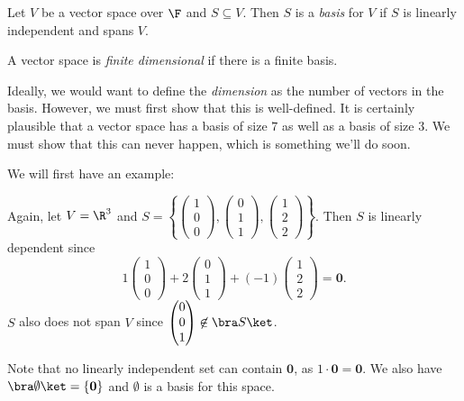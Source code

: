 \documentclass[a4paper]{article}
\begin{document}
\begin{defi}[Basis]
  Let $V$ be a vector space over $\F$ and $S\subseteq V$. Then $S$ is a \emph{basis} for $V$ if $S$ is linearly independent and spans $V$.
\end{defi}

\begin{defi}
  A vector space is \emph{finite dimensional} if there is a finite basis.
\end{defi}
Ideally, we would want to define the \emph{dimension} as the number of vectors in the basis. However, we must first show that this is well-defined. It is certainly plausible that a vector space has a basis of size $7$ as well as a basis of size $3$. We must show that this can never happen, which is something we'll do soon.

We will first have an example:
\begin{eg}
  Again, let $V = \R^3$ and $S = \left\{\begin{pmatrix}1\\0\\0\end{pmatrix}, \begin{pmatrix}0\\1\\1\end{pmatrix}, \begin{pmatrix}1\\2\\2\end{pmatrix}\right\}$. Then $S$ is linearly dependent since
  \[
    1\begin{pmatrix}1\\0\\0\end{pmatrix} + 2\begin{pmatrix}0\\1\\1\end{pmatrix} + (-1) \begin{pmatrix}1\\2\\2\end{pmatrix} = \mathbf{0}.
  \]
  $S$ also does not span $V$ since $\begin{pmatrix}0\\0\\1\end{pmatrix}\not \in \bra S\ket$.
\end{eg}

Note that no linearly independent set can contain $\mathbf{0}$, as $1\cdot \mathbf{0} = \mathbf{0}$. We also have $\bra \emptyset\ket = \{\mathbf{0}\}$ and $\emptyset$ is a basis for this space.
\end{document}
